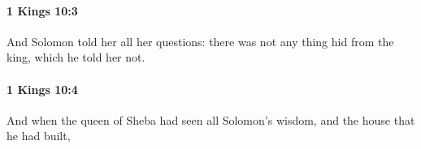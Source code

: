 		\paragraph{1 Kings 10:3} %
			\label{1KINGS-10-3}

			And Solomon told her all her questions: there was not any thing hid from the king, which he told her not.


		\paragraph{1 Kings 10:4} %
			\label{1KINGS-10-4}

			And when the queen of Sheba had seen all Solomon’s wisdom, and the house that he had built,



